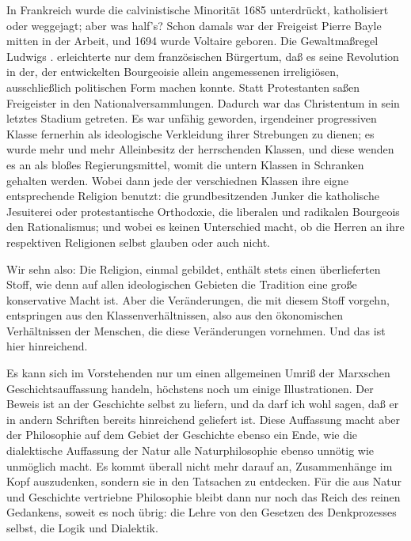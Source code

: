 In Frankreich wurde die calvinistische Minorität 1685
unterdrückt, katholisiert oder weggejagt; aber was half's? Schon damals
war der Freigeist Pierre Bayle mitten in der Arbeit, und 1694 wurde
Voltaire geboren. Die Gewaltmaßregel Ludwigs . erleichterte nur dem
französischen Bürgertum, daß es seine Revolution in der, der
entwickelten Bourgeoisie allein angemessenen irreligiösen,
ausschließlich politischen Form machen konnte. Statt Protestanten saßen
Freigeister in den Nationalversammlungen. Dadurch war das Christentum in
sein letztes Stadium getreten. Es war unfähig geworden, irgendeiner
progressiven Klasse fernerhin als ideologische Verkleidung ihrer
Strebungen zu dienen; es wurde mehr und mehr Alleinbesitz der
herrschenden Klassen, und diese wenden es an als bloßes
Regierungsmittel, womit die untern Klassen in Schranken gehalten werden.
Wobei dann jede der verschiednen Klassen ihre eigne entsprechende
Religion benutzt: die grundbesitzenden Junker die katholische Jesuiterei
oder protestantische Orthodoxie, die liberalen und radikalen Bourgeois
den Rationalismus; und wobei es keinen Unterschied macht, ob die Herren
an ihre respektiven Religionen selbst glauben oder auch nicht.

Wir sehn also: Die Religion, einmal gebildet, enthält stets
einen überlieferten Stoff, wie denn auf allen ideologischen Gebieten die
Tradition eine große konservative Macht ist. Aber die Veränderungen, die
mit diesem Stoff vorgehn, entspringen aus den Klassenverhältnissen, also
aus den ökonomischen Verhältnissen der Menschen, die diese Veränderungen
vornehmen. Und das ist hier hinreichend. %

Es kann sich im Vorstehenden nur um einen allgemeinen Umriß der
Marxschen Geschichtsauffassung handeln, höchstens noch um einige
Illustrationen. Der Beweis ist an
der Geschichte selbst zu liefern, und da darf ich wohl sagen, daß er in
andern Schriften bereits hinreichend geliefert ist. Diese Auffassung
macht aber der Philosophie auf dem Gebiet der Geschichte ebenso ein
Ende, wie die dialektische Auffassung der Natur alle Naturphilosophie
ebenso unnötig wie unmöglich macht. Es kommt überall nicht mehr darauf
an, Zusammenhänge im Kopf auszudenken, sondern sie in den Tatsachen zu
entdecken. Für die aus Natur und Geschichte vertriebne Philosophie
bleibt dann nur noch das Reich des reinen Gedankens, soweit es noch
übrig: die Lehre von den Gesetzen des Denkprozesses selbst, die Logik
und Dialektik.

\asterisc

